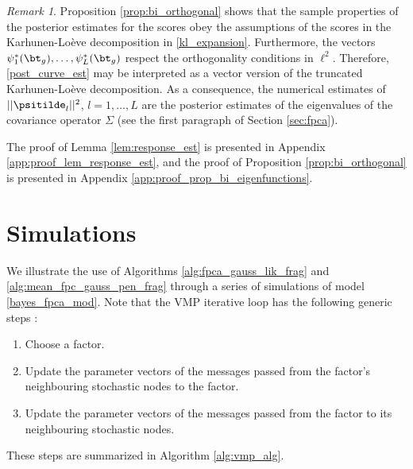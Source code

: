 \documentclass[12pt]{article}
\theoremstyle{plain}
\theoremstyle{definition}
\theoremstyle{remark}
\newtheorem*{remark}{Remark}
\begin{document}
\begin{remark}
	
	Proposition \ref{prop:bi_orthogonal} shows that the sample properties of the posterior estimates for the scores
	obey the assumptions of the scores in the Karhunen-Lo\`{e}ve decomposition in \eqref{kl_expansion}.
	Furthermore, the vectors $\psi^*_1 (\bt_g), \dots, \psi^*_L (\bt_g)$ respect the orthogonality conditions in $\ell^2$.
	Therefore, \eqref{post_curve_est} may be interpreted as a vector version of the truncated
	Karhunen-Lo\`{e}ve decomposition. As a consequence, the numerical estimates of
	$|| \psitilde_l ||^2$, $l = 1, \dots, L$ are the posterior estimates of the eigenvalues of the covariance operator
	$\Sigma$ (see the first paragraph of Section \ref{sec:fpca}).
	
\end{remark}

\noindent The proof of Lemma \ref{lem:response_est} is presented in Appendix \ref{app:proof_lem_response_est},
and the proof of Proposition \ref{prop:bi_orthogonal} is presented in Appendix \ref{app:proof_prop_bi_eigenfunctions}.


\section{Simulations}
\label{sec:sims}

We illustrate the use of Algorithms \ref{alg:fpca_gauss_lik_frag} and \ref{alg:mean_fpc_gauss_pen_frag}
through a series of simulations of model \eqref{bayes_fpca_mod}.
Note that the VMP iterative loop has the following generic steps
\cite{minka05, wand17}:

\begin{enumerate}
	\item Choose a factor.
	\item Update the parameter vectors of the messages passed from the factor's neighbouring stochastic
	nodes to the factor.
	\item Update the parameter vectors of the messages passed from the factor to its neighbouring stochastic
	nodes.
\end{enumerate}

\noindent These steps are summarized in Algorithm \ref{alg:vmp_alg}.
\end{document}
